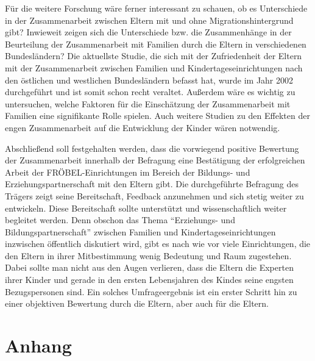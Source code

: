 \documentclass[12pt,a4paper]{article}
\begin{document}
	Für die weitere Forschung wäre ferner interessant zu schauen, ob es Unterschiede in  der Zusammenarbeit zwischen Eltern mit und ohne Migrationshintergrund gibt? Inwieweit zeigen sich die Unterschiede bzw. die Zusammenhänge in der Beurteilung der Zusammenarbeit mit Familien durch die Eltern in verschiedenen Bundesländern?  Die aktuellste Studie, die sich mit der Zufriedenheit der Eltern mit der Zusammenarbeit zwischen Familien und Kindertageseinrichtungen nach den östlichen und westlichen Bundesländern befasst hat, wurde im Jahr 2002 durchgeführt und ist somit schon recht veraltet. Außerdem wäre es wichtig zu untersuchen, welche Faktoren für die Einschätzung der Zusammenarbeit mit Familien eine signifikante Rolle spielen. Auch weitere Studien zu den Effekten der engen Zusammenarbeit auf die Entwicklung der Kinder wären notwendig.
	
	Abschließend soll festgehalten werden, dass die vorwiegend positive Bewertung der Zusammenarbeit innerhalb der Befragung eine Bestätigung der erfolgreichen Arbeit der FRÖBEL-Einrichtungen im Bereich der Bildungs- und Erziehungspartnerschaft mit den Eltern gibt. Die durchgeführte Befragung des Trägers zeigt seine Bereitschaft, Feedback anzunehmen und sich stetig weiter zu entwickeln. Diese Bereitschaft sollte unterstützt und wissenschaftlich weiter begleitet werden. Denn obschon das Thema "`Erziehungs- und Bildungspartnerschaft"' zwischen Familien und Kindertageseinrichtungen inzwischen öffentlich diskutiert wird, gibt es nach wie vor viele Einrichtungen, die den Eltern in ihrer Mitbestimmung wenig Bedeutung und Raum zugestehen. Dabei sollte man nicht aus den Augen verlieren, dass die Eltern die Experten ihrer Kinder und gerade in den ersten Lebensjahren des Kindes seine engsten Bezugspersonen sind. Ein solches Umfrageergebnis ist ein erster Schritt hin zu einer objektiven Bewertung durch die Eltern, aber auch für die Eltern.


      



%




\pagebreak

\begin{appendix}
\section*{Anhang}
\normalsize
\section{}
\end{appendix}
  
\end{document}

